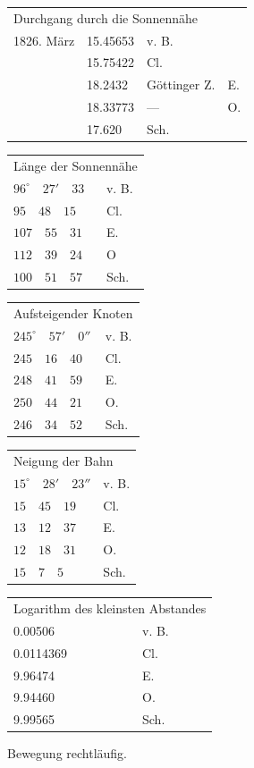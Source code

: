 \begin{center}
\begingroup\small\setlength{\tabcolsep}{5pt}
\begin{tabular}{rlll}
\multicolumn{4}{l}{Durchgang durch die Sonnennähe} \\
1826. März & 15.45653 & v. B. & \\
 & 15.75422 & Cl. & \\
 & 18.2432 & Göttinger Z. & E. \\
 & 18.33773 & --- & O. \\
 & 17.620 & Sch. & \\
\end{tabular}
\par\medskip
\begin{tabular}{ll}
\multicolumn{2}{l}{Länge der Sonnennähe} \\
$96^{\circ}\quad27'\quad33$ & v. B. \\
$95\quad48\quad15$ & Cl. \\
$107\quad55\quad31$ & E. \\
$112\quad39\quad24$ & O \\
$100\quad51\quad57$ & Sch. \\
\end{tabular}
\par\medskip
\begin{tabular}{ll}
\multicolumn{2}{l}{Aufsteigender Knoten} \\
$245^{\circ}\quad57'\quad0''$ & v. B. \\
$245\quad16\quad40$ & Cl. \\
$248\quad41\quad59$ & E. \\
$250\quad44\quad21$ & O. \\
$246\quad34\quad52$ & Sch. \\
\end{tabular}
\par\medskip
\begin{tabular}{ll}
\multicolumn{2}{l}{Neigung der Bahn} \\
$15^{\circ}\quad28'\quad23''$ & v. B. \\
$15\quad45\quad19$ & Cl. \\
$13\quad12\quad37$ & E. \\
$12\quad18\quad31$ & O. \\
$15\quad7\quad5$ & Sch. \\
\end{tabular}
\par\medskip
\begin{tabular}{ll}
\multicolumn{2}{l}{Logarithm des kleinsten Abstandes} \\
0.00506 & v. B. \\
0.0114369 & Cl. \\
9.96474 & E. \\
9.94460 & O. \\
9.99565 & Sch. \\
\end{tabular}
\endgroup
\end{center}
\noindent Bewegung rechtläufig.

